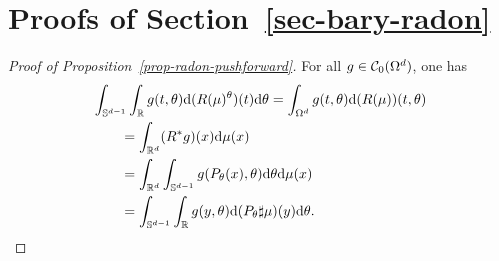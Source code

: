 \section{Proofs of Section~\ref{sec-bary-radon}}
\label{sec-appendix-radon}

\begin{proof}[Proof of Proposition~\ref{prop-radon-pushforward}]
For all $g \in \mathcal{C}_0(\Omega^d)$, one has 
\begin{align*}
&\int_{\mathbb{S}^{d-1}}\int_{\mathbb{R}} g(t, \theta) \mathrm{d}(R(\mu)^\theta)(t) \mathrm{d}\theta = \int_{\Omega^d}g(t, \theta)\mathrm{d}(R(\mu))(t, \theta) \\
	&\qquad = \int_{\mathbb{R}^d}(R^*g)(x)\mathrm{d}\mu(x) \\
	&\qquad = \int_{\mathbb{R}^d}\int_{\mathbb{S}^{d-1}} g(P_\theta(x),\theta) \mathrm{d}\theta \mathrm{d}\mu(x)\\
	&\qquad = \int_{\mathbb{S}^{d-1}} \int_{\mathbb{R}} g(y,\theta) \mathrm{d}(P_\theta \sharp \mu)(y) \mathrm{d}\theta.
\end{align*}
\end{proof}


